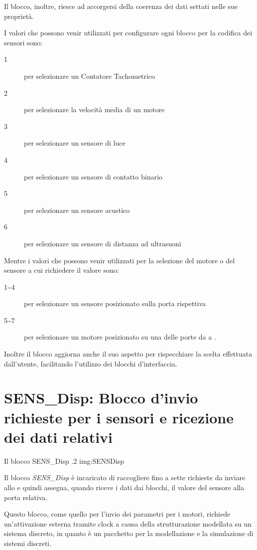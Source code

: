 Il blocco, inoltre, riesce ad accorgersi della coerenza dei dati settati
nelle sue proprietà.

I valori che possono venir utilizzati per configurare ogni blocco per la
codifica dei sensori sono:
\begin{description}
    \item[1] per selezionare un Contatore Tachometrico
    \item[2] per selezionare la velocità media di un motore
    \item[3] per selezionare un sensore di luce
    \item[4] per selezionare un sensore di contatto binario
    \item[5] per selezionare un sensore acustico
    \item[6] per selezionare un sensore di distanza ad ultrasuoni
\end{description}

Mentre i valori che possono venir utilizzati per la selezione del motore o
del sensore a cui richiedere il valore sono:
\begin{description}
    \item[1\textasciitilde{}4] per selezionare un sensore posizionato sulla
        porta rispettiva
    \item[5\textasciitilde{}7] per selezionare un motore posizionato su una
        delle porte da  a .
\end{description}

Inoltre il blocco aggiorna anche il suo aspetto per rispecchiare la scelta
effettuata dall'utente, facilitando l'utilizzo dei blocchi d'interfaccia.

\section[SENS\_Disp]{SENS\_Disp: Blocco d'invio richieste per i sensori e
ricezione dei dati relativi}
        {Il blocco SENS\_Disp}
        {.2}
        {img:SENSDisp}

Il blocco \emph{SENS\_Disp} è incaricato di raccogliere fino a sette
richieste da inviare allo \SPAM{} e quindi assegna, quando riceve i dati
dai blocchi, il valore del sensore alla porta relativa.

Questo blocco, come quello per l'invio dei parametri per i motori, richiede
un'attivazione esterna tramite clock a causa della strutturazione modellata
su un sistema discreto, in quanto \SciCosLab{} è un pacchetto per la
modellazione e la simulazione di sistemi discreti.

